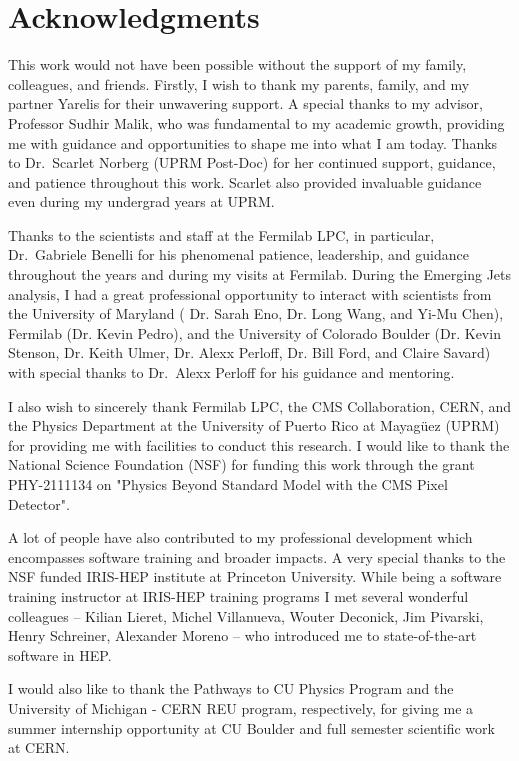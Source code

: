 \chapter{Acknowledgments}

This work would not have been possible without the support of my family, colleagues, and friends. Firstly, I wish to thank my parents, family, and my partner Yarelis for their unwavering support. A special thanks to my advisor, Professor Sudhir Malik, who was fundamental to my academic growth, providing me with guidance and opportunities to shape me into what I am today. Thanks to Dr.~Scarlet Norberg (UPRM Post-Doc) for her continued support, guidance, and patience throughout this work. Scarlet also provided invaluable guidance even during my undergrad years at UPRM.

Thanks to the scientists and staff at the Fermilab LPC, in particular, Dr.~Gabriele Benelli for his phenomenal patience, leadership, and guidance throughout the years and during my visits at Fermilab. During the Emerging Jets analysis, I had a great professional opportunity to interact with scientists from the University of Maryland ( Dr. Sarah Eno, Dr. Long Wang, and Yi-Mu Chen), Fermilab (Dr. Kevin Pedro), and the University of Colorado Boulder (Dr. Kevin Stenson, Dr. Keith Ulmer, Dr. Alexx Perloff, Dr. Bill Ford, and Claire Savard) with special thanks to Dr.~Alexx Perloff for his guidance and mentoring.


I also wish to sincerely thank Fermilab LPC, the CMS Collaboration, CERN, and the Physics Department at the University of Puerto Rico at Mayagüez (UPRM) for providing me with facilities to conduct this research.
I would like to thank the National Science Foundation (NSF) for funding this work through the grant PHY-2111134 on "Physics Beyond Standard Model with the CMS Pixel Detector".

A lot of people have also contributed to my professional development which encompasses software training and broader impacts. A very special thanks to the NSF funded IRIS-HEP institute at Princeton University. While being a software training instructor at IRIS-HEP training programs I met several wonderful colleagues --  Kilian Lieret, Michel Villanueva, Wouter Deconick, Jim Pivarski, Henry Schreiner, Alexander Moreno -- who introduced me to state-of-the-art software in HEP.

I would also like to thank the Pathways to CU Physics Program and the University of Michigan - CERN REU program, respectively, for giving me a summer internship opportunity at CU Boulder and full semester scientific work at CERN.

